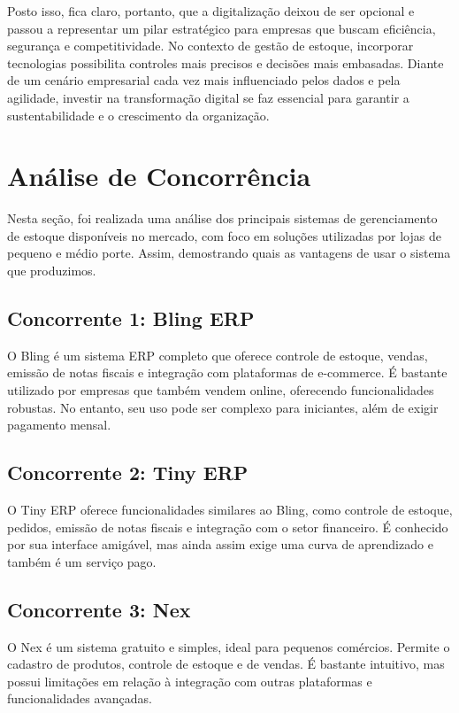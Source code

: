 \documentclass[
	12pt,				%
	openany,			%
	twoside,			%
	a4paper,			%
	english,			%
	brazil				%
	]{abntex2}
\begin{document}
Posto isso, fica claro, portanto, que a digitalização deixou de ser opcional e passou a representar um pilar estratégico para empresas que buscam eficiência, segurança e competitividade. No contexto de gestão de estoque, incorporar tecnologias possibilita controles mais precisos e decisões mais embasadas. Diante de um cenário empresarial cada vez mais influenciado pelos dados e pela agilidade, investir na transformação digital se faz essencial para garantir a sustentabilidade e o crescimento da organização.

\section{Análise de Concorrência}

Nesta seção, foi realizada uma análise dos principais sistemas de gerenciamento de estoque disponíveis no mercado, com foco em soluções utilizadas por lojas de pequeno e médio porte. Assim, demostrando quais as vantagens de usar o sistema que produzimos.

\subsection{Concorrente 1: Bling ERP}
O Bling é um sistema ERP completo que oferece controle de estoque, vendas, emissão de notas fiscais e integração com plataformas de e-commerce. É bastante utilizado por empresas que também vendem online, oferecendo funcionalidades robustas. No entanto, seu uso pode ser complexo para iniciantes, além de exigir pagamento mensal.

\subsection{Concorrente 2: Tiny ERP}
O Tiny ERP oferece funcionalidades similares ao Bling, como controle de estoque, pedidos, emissão de notas fiscais e integração com o setor financeiro. É conhecido por sua interface amigável, mas ainda assim exige uma curva de aprendizado e também é um serviço pago.

\subsection{Concorrente 3: Nex}
O Nex é um sistema gratuito e simples, ideal para pequenos comércios. Permite o cadastro de produtos, controle de estoque e de vendas. É bastante intuitivo, mas possui limitações em relação à integração com outras plataformas e funcionalidades avançadas.
\end{document}

